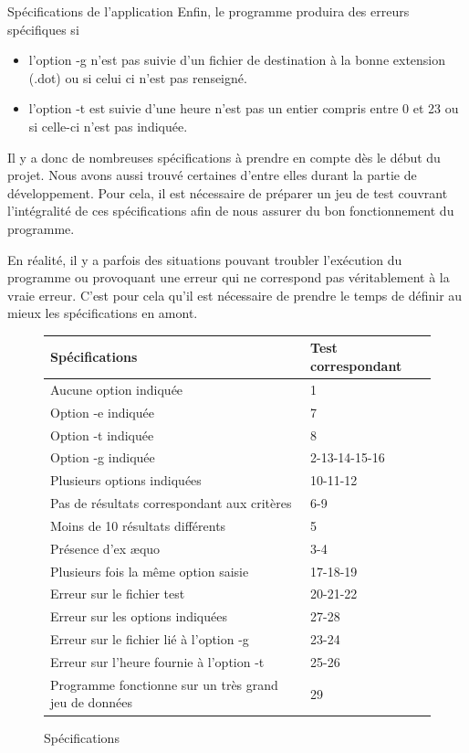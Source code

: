 \documentclass[11pt]{article}
\begin{document}
\begin{section}{Spécifications de l'application}
Enfin, le programme produira des erreurs spécifiques si 
\begin{itemize}
\item l'option -g n'est pas suivie d'un fichier de destination à la bonne extension (.dot) ou si celui ci n'est pas renseigné.
\item l'option -t est suivie d'une heure n'est pas un entier compris entre 0 et 23 ou si celle-ci n'est pas indiquée.
\newline
\end{itemize} 



Il y a donc de nombreuses spécifications à prendre en compte dès le début du projet. Nous avons aussi trouvé certaines d'entre elles durant la partie de développement. Pour cela, il est nécessaire de préparer un jeu de test couvrant l'intégralité de ces spécifications afin de nous assurer du bon fonctionnement du programme.

En réalité, il y a parfois des situations pouvant troubler l'exécution du programme ou provoquant une erreur qui ne correspond pas véritablement à la vraie erreur. C'est pour cela qu'il est nécessaire de prendre le temps de définir au mieux les spécifications en amont.

\renewcommand{\arraystretch}{1.4} 
\begin{figure}[h]
\begin{center}
\begin{tabular}{ | p{11cm} | p{4cm} |}
\hline
\bf Spécifications & \bf Test correspondant \\

\hline
Aucune option indiquée & 1 \\
\hline
Option -e indiquée & 7 \\
\hline
Option -t indiquée & 8 \\
\hline
Option -g indiquée & 2-13-14-15-16 \\
\hline
Plusieurs options indiquées & 10-11-12 \\
\hline
Pas de résultats correspondant aux critères & 6-9 \\
\hline
Moins de 10 résultats différents & 5\\
\hline
Présence d'ex \ae quo & 3-4 \\
\hline
Plusieurs fois la même option saisie & 17-18-19 \\
\hline
Erreur sur le fichier test & 20-21-22 \\
\hline
Erreur sur les options indiquées & 27-28 \\
\hline
Erreur sur le fichier lié à l'option -g & 23-24 \\
\hline
Erreur sur l'heure fournie à l'option -t & 25-26 \\
\hline
Programme fonctionne sur un très grand jeu de données & 29 \\
\hline
\end{tabular}
\end{center}
\caption{Spécifications}
\label{Spécifications}
\end{figure}
\end{section}
\end{document}
